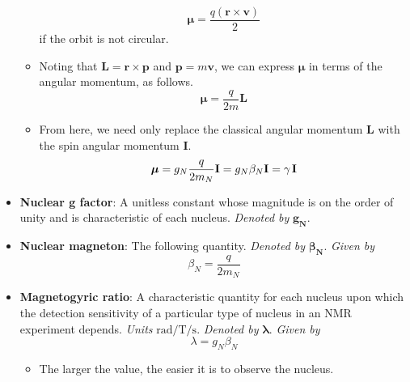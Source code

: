 \documentclass[../notes.tex]{subfiles}
\begin{document}
\begin{itemize}
\begin{itemize}
        \begin{equation*}
            \bm{\mu} = \frac{q(\mathbf{r}\times\mathbf{v})}{2}
        \end{equation*}
        if the orbit is not circular.
        \item Noting that $\mathbf{L}=\mathbf{r}\times\mathbf{p}$ and $\mathbf{p}=m\mathbf{v}$, we can express $\bm{\mu}$ in terms of the angular momentum, as follows.
        \begin{equation*}
            \bm{\mu} = \frac{q}{2m}\mathbf{L}
        \end{equation*}
        \item From here, we need only replace the classical angular momentum $\mathbf{L}$ with the spin angular momentum $\mathbf{I}$.
        \begin{equation*}
            \bm{\mu} = g_N\frac{q}{2m_N}\mathbf{I}
            = g_N\beta_N\mathbf{I}
            = \gamma\hspace{0.13em}\mathbf{I}
        \end{equation*}
    \end{itemize}
    \item \textbf{Nuclear g factor}: A unitless constant whose magnitude is on the order of unity and is characteristic of each nucleus. \emph{Denoted by} $\bm{g_N}$.
    \item \textbf{Nuclear magneton}: The following quantity. \emph{Denoted by} $\bm{\beta_N}$. \emph{Given by}
    \begin{equation*}
        \beta_N = \frac{q}{2m_N}
    \end{equation*}
    \item \textbf{Magnetogyric ratio}: A characteristic quantity for each nucleus upon which the detection sensitivity of a particular type of nucleus in an NMR experiment depends. \emph{Units} $\si{\radian\per\tesla\per\second}$. \emph{Denoted by} $\bm{\lambda}$. \emph{Given by}
    \begin{equation*}
        \lambda = g_N\beta_N
    \end{equation*}
    \begin{itemize}
        \item The larger the value, the easier it is to observe the nucleus.
    \end{itemize}
    \begin{table}[H]
        \centering
        \small
        \begin{tabular}{ccS[table-format=1.4]S[table-format=1.4]S[table-format=2.4]}

\end{tabular}
\end{table}
\end{itemize}
\end{document}
